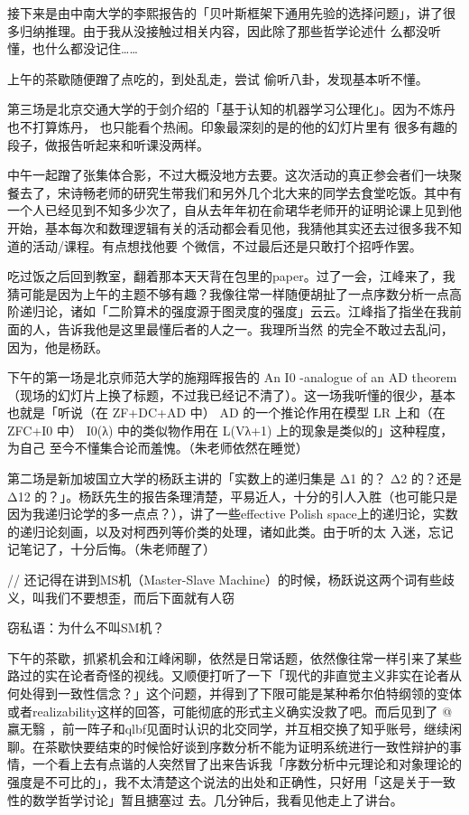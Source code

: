 \documentclass{article}
\begin{document}
接下来是由中南大学的李熙报告的「贝叶斯框架下通用先验的选择问题」，讲了很多归纳推理。由于我从没接触过相关内容，因此除了那些哲学论述什
么都没听懂，也什么都没记住…… 

上午的茶歇随便蹭了点吃的，到处乱走，尝试
偷听八卦，发现基本听不懂。 

第三场是北京交通大学的于剑介绍的「基于认知的机器学习公理化」。因为不炼丹也不打算炼丹，
\newpage
也只能看个热闹。印象最深刻的是的他的幻灯片里有
很多有趣的段子，做报告听起来和听课没两样。 

中午一起蹭了张集体合影，不过大概没地方去要。这次活动的真正参会者们一块聚餐去了，宋诗畅老师的研究生带我们和另外几个北大来的同学去食堂吃饭。其中有一个人已经见到不知多少次了，自从去年年初在俞珺华老师开的证明论课上见到他开始，基本每次和数理逻辑有关的活动都会看见他，我猜他其实还去过很多我不知道的活动/课程。有点想找他要
个微信，不过最后还是只敢打个招呼作罢。 

吃过饭之后回到教室，翻着那本天天背在包里的paper。过了一会，江峰来了，我猜可能是因为上午的主题不够有趣？我像往常一样随便胡扯了一点序数分析一点高阶递归论，诸如「二阶算术的强度源于图灵度的强度」云云。江峰指了指坐在我前面的人，告诉我他是这里最懂后者的人之一。我理所当然
的完全不敢过去乱问，因为，他是杨跃。 

下午的第一场是北京师范大学的施翔晖报告的
\newpage
An I0 -analogue of an AD theorem（现场的幻灯片上换了标题，不过我已经记不清了）。这一场我听懂的很少，基本也就是「听说（在 ZF+DC+AD 中） AD 的一个推论作用在模型 LR 上和（在 ZFC+I0 中） I0(λ) 中的类似物作用在 L(Vλ+1) 上的现象是类似的」这种程度，为自己
至今不懂集合论而羞愧。（朱老师依然在睡觉） 

第二场是新加坡国立大学的杨跃主讲的「实数上的递归集是 Δ1 的？ Δ2 的？还是 Δ12 的？」。杨跃先生的报告条理清楚，平易近人，十分的引人入胜（也可能只是因为我递归论学的多一点点？），讲了一些effective Polish space上的递归论，实数的递归论刻画，以及对柯西列等价类的处理，诸如此类。由于听的太
入迷，忘记记笔记了，十分后悔。（朱老师醒了） 

// 还记得在讲到MS机（Master-Slave Machine）的时候，杨跃说这两个词有些歧义，叫我们不要想歪，而后下面就有人窃
\newpage

窃私语：为什么不叫SM机？ 

下午的茶歇，抓紧机会和江峰闲聊，依然是日常话题，依然像往常一样引来了某些路过的实在论者奇怪的视线。又顺便打听了一下「现代的非直觉主义非实在论者从何处得到一致性信念？」这个问题，并得到了下限可能是某种希尔伯特纲领的变体或者realizability这样的回答，可能彻底的形式主义确实没救了吧。而后见到了 
@嬴无翳
 ，前一阵子和qlbf见面时认识的北交同学，并互相交换了知乎账号，继续闲聊。在茶歇快要结束的时候恰好谈到序数分析不能为证明系统进行一致性辩护的事情，一个看上去有点谐的人突然冒了出来告诉我「序数分析中元理论和对象理论的强度是不可比的」，我不太清楚这个说法的出处和正确性，只好用「这是关于一致性的数学哲学讨论」暂且搪塞过
去。几分钟后，我看见他走上了讲台。 
\end{document}

